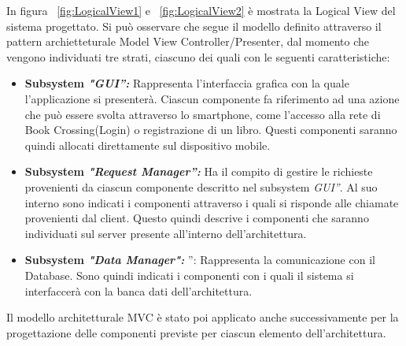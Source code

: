 \noindent
In figura ~\ref{fig:LogicalView1} e ~\ref{fig:LogicalView2} è mostrata la Logical View del sistema progettato. Si può osservare che segue il modello definito attraverso il pattern archietteturale Model View Controller/Presenter, dal momento che vengono individuati tre strati, ciascuno dei quali con le seguenti caratteristiche:
\begin{itemize}
	\item \textbf{Subsystem \textit{"GUI”:}} Rappresenta l’interfaccia grafica con la quale l’applicazione si presenterà. Ciascun componente fa riferimento ad una azione che può essere svolta attraverso lo smartphone, come l’accesso alla rete di Book Crossing(Login) o registrazione di un  libro. Questi componenti saranno quindi allocati direttamente sul dispositivo mobile. 
	\item \textbf{Subsystem \textit{"Request Manager”:}} Ha il compito di gestire le richieste provenienti da ciascun componente descritto nel subsystem \textit{GUI”}. Al suo interno sono indicati i componenti attraverso i quali si risponde alle chiamate provenienti dal client. Questo quindi descrive i componenti che saranno individuati sul server presente all’interno dell’architettura.
	\item \textbf{Subsystem \textit{"Data Manager":}} ”: Rappresenta la comunicazione con il Database. Sono quindi indicati i componenti con i quali il sistema si interfaccerà con la banca dati dell’architettura.
\end{itemize}
Il modello architetturale MVC è stato poi applicato anche successivamente per la progettazione delle componenti previste per ciascun elemento dell'architettura.